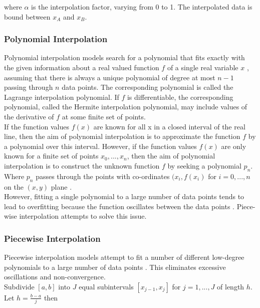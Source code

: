 where $\alpha$ is the interpolation factor, varying from 0 to 1. The interpolated data is bound between $x_A$ and $x_B$.

\subsubsection{Polynomial Interpolation}

Polynomial interpolation models search for a polynomial that fits exactly with the given information about a real valued function $f$ of a single real variable $x$ \cite{intro-to-numerical-analysis-suli}, assuming that there is always a unique polynomial of degree at most $n-1$ passing through $n$ data points. The corresponding polynomial is called the Lagrange interpolation polynomial. If $f$ is differentiable, the corresponding polynomial, called the Hermite interpolation polynomial, may include values of the derivative of $f$ at some finite set of points. \\

If the function values $f(x)$ are known for all x  in a closed interval of the real line, then the aim of polynomial interpolation is to approximate the function $f$ by a polynomial over this interval. However, if the function values $f(x)$ are only known for a finite set of points $x_0, ..., x_n$, then the aim of polynomial interpolation is to construct the unknown function $f$ by seeking a polynomial $p_n$. Where $p_n$ passes through the points with co-ordinates $(x_i, f(x_i)$ for $i = 0, ..., n$ on the $(x, y)$ plane \cite{intro-to-numerical-analysis-suli}. \\

However, fitting a single polynomial to a large number of data points tends to lead to overfitting because the function oscillates between the data points \cite{intro-to-numerical-analysis-atkinson}. Piece-wise interpolation attempts to solve this issue. 

\subsubsection{Piecewise Interpolation}

Piecewise interpolation models attempt to fit a number of different low-degree polynomials to a large number of data points \cite{intro-to-numerical-analysis-atkinson}. This eliminates excessive oscillations and non-convergence.\\

Subdivide $[a, b]$ into $J$ equal subintervals $[x_{j-1}, x_j]$ for $j = 1, ..., J$ of length $h$. Let $h = \frac{b-a}{j}$ then 


